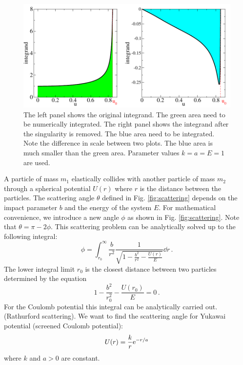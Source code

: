\begin{figure}[bt]
\centerline{\includegraphics[width=5.0in]{03.integrals/scattering-integrand.pdf}}
\caption{
The left panel shows the original integrand.  The green area need to be
numerically integrated. The right panel shows the integrand after the
singularity is removed.  The blue area need to be integrated.  Note the
difference in scale between two plots.  The blue area is much smaller than the
green area. Parameter values $k=a=E=1$ are used.}
\label{fig:scattering-integrand}
\end{figure}

\noindent
A particle of mass $m_1$ elastically collides with another particle of mass $m_2$ through a spherical potential $U(r)$ where $r$ is the distance between the particles.  The scattering angle $\theta$ defined in Fig. \ref{fig:scattering} depends on the impact parameter $b$ and the energy of the system $E$.
For mathematical convenience, we introduce a new angle $\phi$ as shown in Fig. \ref{fig:scattering}.  Note that $\theta = \pi - 2 \phi$.
This scattering problem can be analytically solved  up to the following integral\cite{Goldstein2002}:
\begin{equation}\label{eq:phi_r}
\phi = \int_{r_0}^{\infty} \frac{b}{r^2} \frac{1}{\sqrt{1 - \displaystyle\frac{b^2}{r^2}-\displaystyle\frac{U(r)}{E}}} \dd{r}\, .
\end{equation}
The lower integral limit $r_0$ is the closest distance between two particles determined by the equation
\begin{equation}\label{eq:root_r}
1 - \frac{b^2}{r_0^2}-\frac{U(r_0)}{E} = 0\, .
\end{equation}
For the Coulomb potential this integral can be analytically carried out.(Rathurford scattering).\cite{Goldstein2002}  We want to find the scattering angle for Yukawai potential (screened Coulomb potential):
\[
U(r) = \displaystyle\frac{k}{r} \text{e}^{-r/a}
\]
where $k$ and $a>0$ are constant.

